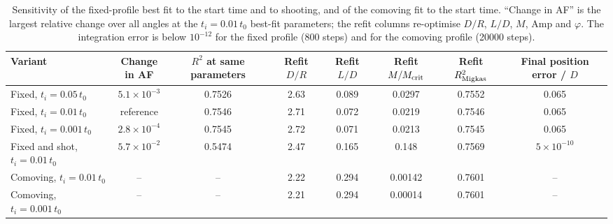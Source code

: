 \documentclass[10pt,letterpaper]{article}
\begin{document}
\begin{table}[H]\centering\footnotesize\setlength{\tabcolsep}{4pt}
\caption{Sensitivity of the fixed-profile best fit to the start time and to shooting, and of the comoving fit to the start time. ``Change in AF'' is the largest relative change over all angles at the $t_i=0.01\,t_0$ best-fit parameters; the refit columns re-optimise $D/R$, $L/D$, $M$, Amp and $\varphi$. The integration error is below $10^{-12}$ for the fixed profile (800 steps) and for the comoving profile (20000 steps).}\label{tab:sens}
\begin{tabular}{lccccccc}\toprule
Variant & \shortstack{Change\\in AF} & \shortstack{$R^2$ at same\\parameters} & \shortstack{Refit\\$D/R$} & \shortstack{Refit\\$L/D$} & \shortstack{Refit\\$M/M_{\rm crit}$} & \shortstack{Refit\\$R^2_{\rm Migkas}$} & \shortstack{Final position\\error / $D$}\\\midrule
Fixed, $t_i=0.05\,t_0$ & $5.1\times10^{-3}$ & 0.7526 & 2.63 & 0.089 & 0.0297 & 0.7552 & 0.065\\
Fixed, $t_i=0.01\,t_0$ & reference & 0.7546 & 2.71 & 0.072 & 0.0219 & 0.7546 & 0.065\\
Fixed, $t_i=0.001\,t_0$ & $2.8\times10^{-4}$ & 0.7545 & 2.72 & 0.071 & 0.0213 & 0.7545 & 0.065\\
Fixed and shot, $t_i=0.01\,t_0$ & $5.7\times10^{-2}$ & 0.5474 & 2.47 & 0.165 & 0.148 & 0.7569 & $5\times10^{-10}$\\
Comoving, $t_i=0.01\,t_0$ & -- & -- & 2.22 & 0.294 & 0.00142 & 0.7601 & --\\
Comoving, $t_i=0.001\,t_0$ & -- & -- & 2.21 & 0.294 & 0.00014 & 0.7601 & --\\\bottomrule
\end{tabular}\end{table}
\end{document}
